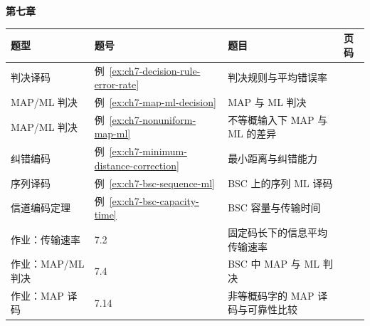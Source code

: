 {\noindent\textbf{第七章}\par
\begin{tabularx}{\textwidth}{@{}p{}p{}>{\raggedright\arraybackslash}X>{\raggedleft\arraybackslash}p{}@{}}
\toprule
\textbf{题型} & \textbf{题号} & \textbf{题目} & \textbf{页码} \\
\midrule
判决译码 & 例~\ref{ex:ch7-decision-rule-error-rate} & 判决规则与平均错误率 & \hyperref[ex:ch7-decision-rule-error-rate]{\pageref*{ex:ch7-decision-rule-error-rate}}  \\
MAP/ML 判决 & 例~\ref{ex:ch7-map-ml-decision} & MAP 与 ML 判决 & \hyperref[ex:ch7-map-ml-decision]{\pageref*{ex:ch7-map-ml-decision}}  \\
MAP/ML 判决 & 例~\ref{ex:ch7-nonuniform-map-ml} & 不等概输入下 MAP 与 ML 的差异 & \hyperref[ex:ch7-nonuniform-map-ml]{\pageref*{ex:ch7-nonuniform-map-ml}}  \\
纠错编码 & 例~\ref{ex:ch7-minimum-distance-correction} & 最小距离与纠错能力 & \hyperref[ex:ch7-minimum-distance-correction]{\pageref*{ex:ch7-minimum-distance-correction}}  \\
序列译码 & 例~\ref{ex:ch7-bsc-sequence-ml} & BSC 上的序列 ML 译码 & \hyperref[ex:ch7-bsc-sequence-ml]{\pageref*{ex:ch7-bsc-sequence-ml}}  \\
信道编码定理 & 例~\ref{ex:ch7-bsc-capacity-time} & BSC 容量与传输时间 & \hyperref[ex:ch7-bsc-capacity-time]{\pageref*{ex:ch7-bsc-capacity-time}}  \\
作业：传输速率 & 7.2 & 固定码长下的信息平均传输速率 & \hyperref[hw:ch7-2-fixed-code-length-transmission-rate]{\pageref*{hw:ch7-2-fixed-code-length-transmission-rate}}  \\
作业：MAP/ML 判决 & 7.4 & BSC 中 MAP 与 ML 判决 & \hyperref[hw:ch7-4-bsc-map-ml-decision]{\pageref*{hw:ch7-4-bsc-map-ml-decision}}  \\
作业：MAP 译码 & 7.14 & 非等概码字的 MAP 译码与可靠性比较 & \hyperref[hw:ch7-14-nonuniform-map-reliability]{\pageref*{hw:ch7-14-nonuniform-map-reliability}}  \\
\bottomrule
\end{tabularx}

}
